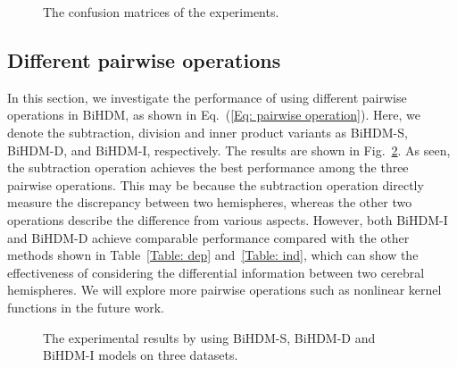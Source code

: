 \documentclass[journal]{IEEEtran}
\begin{document}
\begin{figure}[htb]
	\centering
	\caption*{(1) Subject-dependent experiment results}
	\caption*{(2) Subject-independent experiment results}
	\caption{The confusion matrices of the experiments.}
	\label{Fig: CM}
\end{figure}


\subsection{Different pairwise operations}
\label{Section: different pairwise operations}
In this section, we investigate the performance of using different pairwise operations in BiHDM, as shown in Eq.~(\ref{Eq: pairwise operation}). Here, we denote the subtraction, division and inner product variants as BiHDM-S, BiHDM-D, and BiHDM-I, respectively. The results are shown in Fig.~\ref{Fig: different pairwise operations}. As seen, the subtraction operation achieves the best performance among the three pairwise operations. This may be because the subtraction operation directly measure the discrepancy between two hemispheres, whereas the other two operations describe the difference from various aspects. However, both BiHDM-I and BiHDM-D achieve comparable performance compared with the other methods shown in Table~\ref{Table: dep} and~\ref{Table: ind}, which can show the effectiveness of considering the differential information between two cerebral hemispheres. We will explore more pairwise operations such as nonlinear kernel functions in the future work.
\begin{figure}[htb]
	\caption{The experimental results by using BiHDM-S, BiHDM-D and BiHDM-I models on three datasets.}
	\label{Fig: different pairwise operations}
\end{figure}
\end{document}
